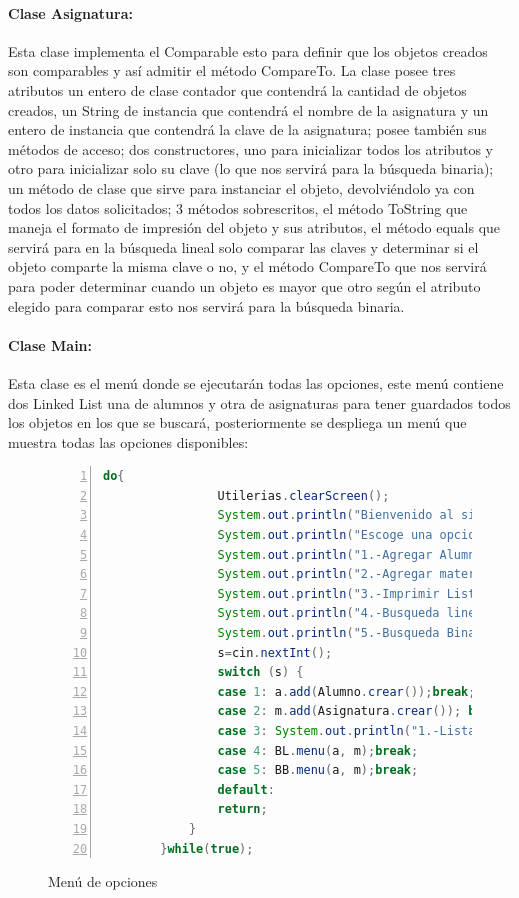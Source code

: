 \documentclass{report}
\begin{document}
\paragraph{Clase Asignatura:}
Esta clase implementa el Comparable esto para definir que los objetos creados son comparables y así admitir el método CompareTo. La clase posee tres atributos un entero de clase contador que contendrá la cantidad de objetos creados, un String de instancia que contendrá el nombre de la asignatura y un entero de instancia que contendrá la clave de la asignatura; posee también sus métodos de acceso; dos constructores, uno para inicializar todos los atributos y otro para inicializar solo su clave (lo que nos servirá para la búsqueda binaria); un método de clase que sirve para instanciar el objeto, devolviéndolo ya con todos los datos solicitados; 3 métodos sobrescritos, el método ToString que maneja el formato de impresión del objeto y sus atributos, el método equals que servirá para en la búsqueda lineal solo comparar las claves y determinar si el objeto comparte la misma clave o no, y el método CompareTo que nos servirá para poder determinar cuando un objeto es mayor que otro según el atributo elegido para comparar esto nos servirá para la búsqueda binaria.
\paragraph{Clase Main:}
Esta clase es el menú donde se ejecutarán todas las opciones, este menú contiene dos Linked List una de alumnos y otra de asignaturas para tener guardados todos los objetos en los que se buscará, posteriormente se despliega un menú que muestra todas las opciones disponibles:

\begin{figure}[htbp]
\centering
\begin{lstlisting}[language=Java, frame=lines, framesep=2mm, basicstyle=\footnotesize\ttfamily, numbers=left]
      do{
                Utilerias.clearScreen();
                System.out.println("Bienvenido al sistema de busqueda de alumnos");
                System.out.println("Escoge una opcion");
                System.out.println("1.-Agregar Alumno");
                System.out.println("2.-Agregar materia");
                System.out.println("3.-Imprimir Listas");
                System.out.println("4.-Busqueda lineal");
                System.out.println("5.-Busqueda Binaria");
                s=cin.nextInt();
                switch (s) {
                case 1: a.add(Alumno.crear());break;
                case 2: m.add(Asignatura.crear()); break;
                case 3: System.out.println("1.-Lista Alumnos 2.-Lista Materias"); s=cin.nextInt(); if(s==1){Imprimir(a);}else{Imprimir(m);} ; break;
                case 4: BL.menu(a, m);break;
                case 5: BB.menu(a, m);break;
                default:
                return;
            }
        }while(true);
\end{lstlisting}
\caption{Menú de opciones}
\end{figure}
\end{document}
